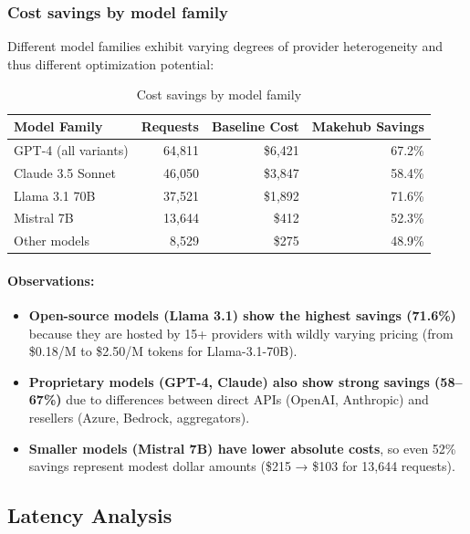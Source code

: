 \documentclass[english]{article}
\begin{document}
\subsubsection{Cost savings by model family}

Different model families exhibit varying degrees of provider heterogeneity and thus different optimization potential:

\begin{table}[H]
\centering
\caption{Cost savings by model family}
\begin{tabular}{|l|r|r|r|}
\hline
\textbf{Model Family} & \textbf{Requests} & \textbf{Baseline Cost} & \textbf{Makehub Savings} \\
\hline
GPT-4 (all variants) & 64,811 & \$6,421 & 67.2\% \\
\hline
Claude 3.5 Sonnet & 46,050 & \$3,847 & 58.4\% \\
\hline
Llama 3.1 70B & 37,521 & \$1,892 & 71.6\% \\
\hline
Mistral 7B & 13,644 & \$412 & 52.3\% \\
\hline
Other models & 8,529 & \$275 & 48.9\% \\
\hline
\end{tabular}
\end{table}

\paragraph{Observations:}

\begin{itemize}
\item \textbf{Open-source models (Llama 3.1) show the highest savings (71.6\%)} because they are hosted by 15+ providers with wildly varying pricing (from \$0.18/M to \$2.50/M tokens for Llama-3.1-70B).

\item \textbf{Proprietary models (GPT-4, Claude) also show strong savings (58--67\%)} due to differences between direct APIs (OpenAI, Anthropic) and resellers (Azure, Bedrock, aggregators).

\item \textbf{Smaller models (Mistral 7B) have lower absolute costs}, so even 52\% savings represent modest dollar amounts (\$215 → \$103 for 13,644 requests).
\end{itemize}

\subsection{Latency Analysis}
\end{document}
